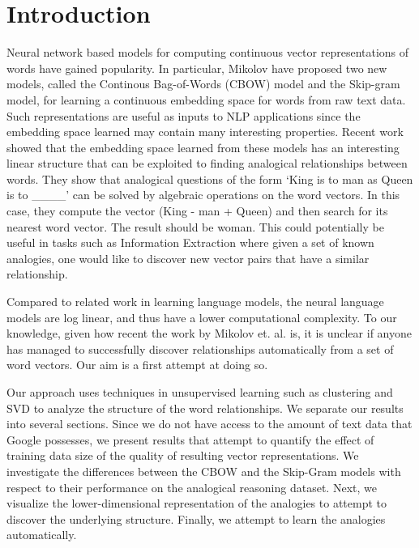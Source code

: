 \section{Introduction}
Neural network based models for computing continuous vector representations of words have gained popularity. 
In particular, Mikolov \etal \cite{mikolov1, mikolov2} have proposed two new models, called the Continous Bag-of-Words (CBOW) model and the Skip-gram model, for learning a continuous embedding space for words from raw text data. Such representations are useful as inputs to NLP applications since the embedding space learned may contain many interesting properties. Recent work\etal \cite{mikolov3} showed that the embedding space learned from these models has an interesting linear structure that can be exploited to finding analogical relationships between words. They show that analogical questions of the form `King is to man as Queen is to \_\_\_\_' can be solved by algebraic operations on the word vectors. In this case, they compute the vector (King - man + Queen) and then search for its nearest word vector. The result should be woman. This could potentially be useful in tasks such as Information Extraction where given a set of known analogies, one would like to discover new vector pairs that have a similar relationship. 

Compared to related work in learning language models\cite{bengio,mikolov5}, the neural language models are log linear, and thus have a lower computational complexity. To our knowledge, given how recent the work by Mikolov et. al. is, it is unclear if anyone has managed to successfully discover relationships automatically from a set of word vectors. Our aim is a first attempt at doing so. 

Our approach uses techniques in unsupervised learning such as clustering and SVD to analyze the structure of the word relationships. We separate our results into several sections. Since we do not have access to the amount of text data that Google possesses, we present results that attempt to quantify the effect of training data size of the quality of resulting vector representations. We investigate the differences between the CBOW and the Skip-Gram models with respect to their performance on the analogical reasoning dataset. Next, we visualize the lower-dimensional representation of the analogies to attempt to discover the underlying structure. Finally, we attempt to learn the analogies automatically.   
